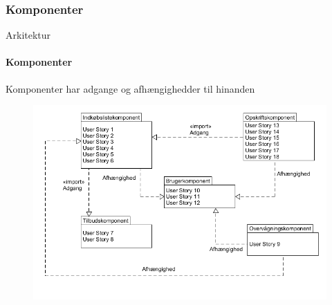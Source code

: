 		\subsubsection{Komponenter}
		\begin{frame}[t]{Arkitektur}\framesubtitle{Komponenter}
			Komponenter har adgange og afhængighedder til hinanden
			\hspace{-20pt}
			\begin{figure}[h!]
				\centering
				\includegraphics[width=1\textwidth]{images/Komponenter.png} %
			\end{figure}
		\end{frame}

